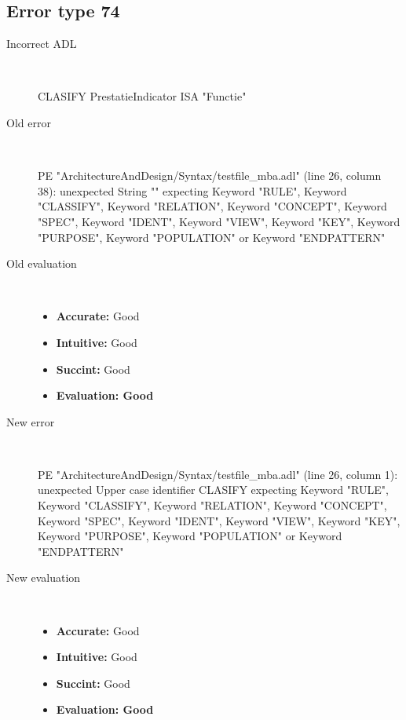 \hrulefill

\subsection{Error type 74}
  \begin{description}
  \item[Incorrect ADL]~\\
\begin{adl}
CLASIFY PrestatieIndicator ISA "Functie"\end{adl}
  \item[Old error]~\\
\begin{haskell}
PE "ArchitectureAndDesign/Syntax/testfile_mba.adl" (line 26, column 38):
unexpected String ""
expecting Keyword "RULE", Keyword "CLASSIFY", Keyword "RELATION", Keyword "CONCEPT", Keyword "SPEC", Keyword "IDENT", Keyword "VIEW", Keyword "KEY", Keyword "PURPOSE", Keyword "POPULATION" or Keyword "ENDPATTERN"\end{haskell}
  \item[Old evaluation]~\\
    \begin{itemize}
    \item \textbf{Accurate:} Good
    \item \textbf{Intuitive:} Good
    \item \textbf{Succint:} Good
    \item \textbf{Evaluation: Good}
    \end{itemize}
  \item[New error]~\\
\begin{haskell}
PE "ArchitectureAndDesign/Syntax/testfile_mba.adl" (line 26, column 1):
unexpected Upper case identifier CLASIFY
expecting Keyword "RULE", Keyword "CLASSIFY", Keyword "RELATION", Keyword "CONCEPT", Keyword "SPEC", Keyword "IDENT", Keyword "VIEW", Keyword "KEY", Keyword "PURPOSE", Keyword "POPULATION" or Keyword "ENDPATTERN"
\end{haskell}
  \item[New evaluation]~\\
    \begin{itemize}
    \item \textbf{Accurate:} Good
    \item \textbf{Intuitive:} Good
    \item \textbf{Succint:} Good
    \item \textbf{Evaluation: Good
}
    \end{itemize}
  \end{description}

